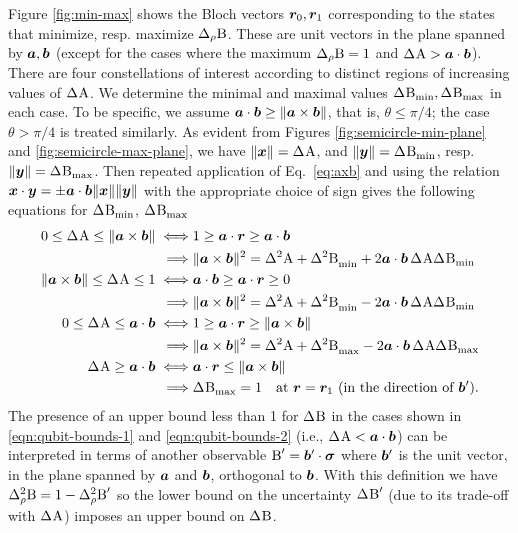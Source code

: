 Figure \ref{fig:min-max}  shows the Bloch vectors $\bm{r}_0,\bm{r}_1$ corresponding to the states that minimize, resp. maximize $\sdevr{\opb}$. These are unit vectors in the plane spanned by $\bm{a},\bm{b}$ (except for the cases where the maximum $\sdevr{\opb}=1$ and $\sdev{\opa} > \boa\cdot\bob$). There are four constellations of interest according to distinct regions of increasing values of $\sdev{\opa}$. We determine the minimal and maximal values $\sdevmin{\opb},\sdevmax{\opb}$ in each case. To be specific, we assume $\bm{a}\cdot\bm{b}\ge\|\bm{a}\times\bm{b}\|$, that is, $\theta\le\pi/4$; the case $\theta>\pi/4$ is treated similarly. As evident from Figures \ref{fig:semicircle-min-plane} and \ref{fig:semicircle-max-plane}, we have $\|\boex\|=\sdev{\opa}$, and $\|\boy\|=\sdevmin{\opb}$, resp. $\|\boy\|=\sdevmax{\opb}$. Then repeated application of Eq.~\ref{eq:axb} and using the relation $\bm{x}\cdot\bm{y}=\pm\bm{a}\cdot\bm{b}\|\bm{x}\|\|\bm{y}\|$ with the appropriate choice of sign gives the following equations for $\sdevmin{\opb}$, $\sdevmax{\opb}$
\begin{align}
  \label{eqn:qubit-bounds-1}
   0\leq\sdev{\opa} \leq\|\boa\times\bob\|\iff &1\geq \boa\cdot\bor\geq\boa\cdot\bob\\
    \implies&\|\boa\times\bob\|^2=\var{\opa}+\varmin{\opb}+2\boa\cdot\bob\,\sdev{\opa}\sdevmin{\opb}\\  
  \label{eqn:qubit-bounds-2}
   \|\boa\times\bob\|\leq\sdev{\opa} \leq 1\iff &\boa\cdot\bob\geq\boa\cdot\bor\geq 0\\
  \implies&\|\boa\times\bob\|^2=\var{\opa}+\varmin{\opb}-2\boa\cdot\bob\,\sdev{\opa}\sdevmin{\opb}\\
  \label{eqn:qubit-bounds-3}
  0\leq\sdev{\opa} \leq\boa\cdot\bob\iff &1\geq\boa\cdot\bor\geq\|\boa\times\bob\|\\
  \implies&\|\boa\times\bob\|^2=\var{\opa}+\varmax{\opb}-2\boa\cdot\bob\,\sdev{\opa}\sdevmax{\opb}\\
  \label{eqn:qubit-bounds-4}
  \sdev{\opa}\geq\boa\cdot\bob\iff&\boa\cdot\bor\leq\|\boa\times\bob\|\\
  \implies&\sdevmax{\opb}=1\quad\text{at }\bor=\bor_1\ (\text{in the direction of }\bob').
\end{align}
The presence of an upper bound less than 1 for $\sdev{\opb}$ in the cases shown in \eqref{eqn:qubit-bounds-1} and \eqref{eqn:qubit-bounds-2} (i.e., $\sdev{\opa}< \boa\cdot\bob$) can be interpreted in terms of another observable $\operatorname{B}^\prime = \bm{b}^\prime\cdot{\boldsymbol\sigma}$ where $\bm{b}^\prime$ is the unit vector, in the plane spanned by $\bm{a}$ and $\bm{b}$, orthogonal to $\bm{b}$. With this definition we have $\varr\opb = 1-\varr{\opb^\prime}$ so the lower bound on the uncertainty  $\sdev{\opb^\prime}$ (due to its trade-off with $\sdev{\opa}$) imposes an upper bound on $\sdev{\opb}$.

